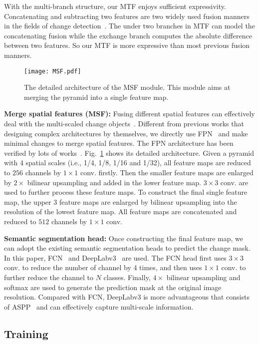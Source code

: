 \documentclass[review]{elsarticle}
\begin{document}
With the multi-branch structure, our MTF enjoys sufficient expressivity. Concatenating and subtracting two features are two widely used fusion manners in the fields of change detection~\cite{FC_EF,ChangeNet,HPCFNet,CosimNet}. The under two branches in MTF can model the concatenating fusion while the exchange branch computes the absolute difference between two features. So our MTF is more expressive than most previous fusion manners.

\begin{figure}
	\centering
	\texttt{[image: MSF.pdf]}
	\caption{The detailed architecture of the MSF module. This module aims at merging the pyramid into a single feature map.}
	\label{fig:MSF}
\end{figure}

\textbf{Merge spatial features (MSF):} Fusing different spatial features can effectively deal with the multi-scaled change objects~\cite{HPCFNet}. Different from previous works that designing complex architectures by themselves, we directly use FPN~\cite{FPN} and make minimal changes to merge spatial features. The FPN architecture has been verified by lots of works~\cite{PFPN,mask_rcnn}. Fig.~\ref{fig:MSF} shows its detailed architecture. Given a pyramid with 4 spatial scales (i.e., 1/4, 1/8, 1/16 and 1/32), all feature maps are reduced to $256$ channels by $1\times 1$ conv. firstly. Then the smaller feature maps are enlarged by $2\times$ bilinear upsampling and added in the lower feature map. $3\times 3$ conv. are used to further process these feature maps. To construct the final single feature map, the upper 3 feature maps are enlarged by bilinear upsampling into the resolution of the lowest feature map. All feature maps are concatenated and reduced to $512$ channels by $1\times 1$ conv.

\textbf{Semantic segmentation head:} Once constructing the final feature map, we can adopt the existing semantic segmentation heads to predict the change mask. In this paper, FCN~\cite{FCN} and DeepLabv3~\cite{deeplabv3} are used. The FCN head first uses $3\times 3$ conv. to reduce the number of channel by 4 times, and then uses $1\times 1$ conv. to further reduce the channel to $N$ classes. Finally, $4\times$ bilinear upsampling and softmax are used to generate the prediction mask at the original image resolution. Compared with FCN, DeepLabv3 is more advantageous that consists of ASPP~\cite{ASPP} and can effectively capture multi-scale information. 

\subsection{Training}
\end{document}
